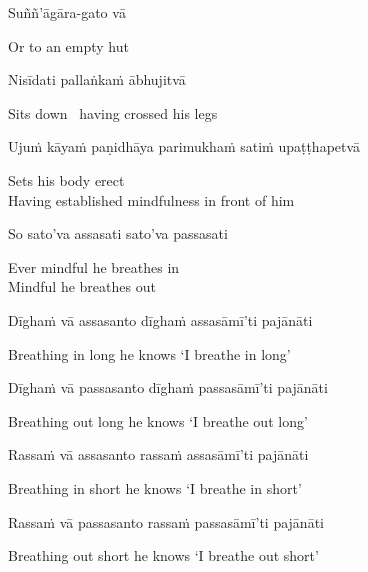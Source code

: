 Suññ'āgāra-gato vā

\begin{english}
  Or to an empty hut
\end{english}

\ifninebythirteen\clearpage\fi

Nisīdati pallaṅkaṁ ābhujitvā

\begin{english}
  Sits down \breathmark\ having crossed his legs
\end{english}

\begin{pali-hang}
Ujuṁ kāyaṁ paṇidhāya parimukhaṁ satiṁ upaṭṭhapetvā
\end{pali-hang}

\begin{english}
  Sets his body erect\\
  Having established mindfulness in front of him
\end{english}

So sato'va assasati sato'va passasati

\begin{english}
  Ever mindful he breathes in\\
  Mindful he breathes out
\end{english}

Dīghaṁ vā assasanto dīghaṁ assasāmī'ti pajānāti

\begin{english}
  Breathing in long he knows `I breathe in long'
\end{english}

Dīghaṁ vā passasanto dīghaṁ passasāmī'ti pajānāti

\begin{english}
  Breathing out long he knows `I breathe out long'
\end{english}

Rassaṁ vā assasanto rassaṁ assasāmī'ti pajānāti

\begin{english}
  Breathing in short he knows `I breathe in short'
\end{english}

\ifbfive\clearpage\fi

Rassaṁ vā passasanto rassaṁ passasāmī'ti pajānāti

\begin{english}
  Breathing out short he knows `I breathe out short'
\end{english}

